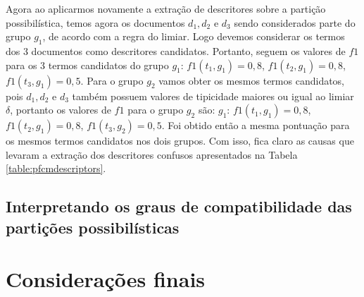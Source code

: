 Agora ao aplicarmos novamente a extração de descritores sobre a partição possibilística, temos agora
os documentos $d_1, d_2$ e $d_3$ sendo considerados parte do grupo $g_1$, de acordo com a regra do
limiar. Logo devemos considerar os termos dos 3 documentos como descritores candidatos. Portanto,
seguem os valores de $f1$ para os 3 termos candidatos do grupo $g_1$: $f1(t_1,g_1) = 0,8$,
$f1(t_2,g_1) = 0,8$, $f1(t_3,g_1) = 0,5$. Para o grupo $g_2$ vamos obter os mesmos termos
candidatos, pois $d_1, d_2$ e $d_3$ também possuem valores de tipicidade maiores ou igual ao limiar
$\delta$, portanto os valores de $f1$ para o grupo $g_2$ são:  $g_1$: $f1(t_1,g_1) = 0,8$,
$f1(t_2,g_1) = 0,8$, $f1(t_3,g_2) = 0,5$. Foi obtido então a mesma pontuação para os mesmos termos
candidatos nos dois grupos. Com isso, fica claro as causas que levaram a extração dos descritores
confusos apresentados na Tabela \ref{table:pfcmdescriptors}.

\subsection{Interpretando os graus de compatibilidade das partições possibilísticas}

\section{Considerações finais}
